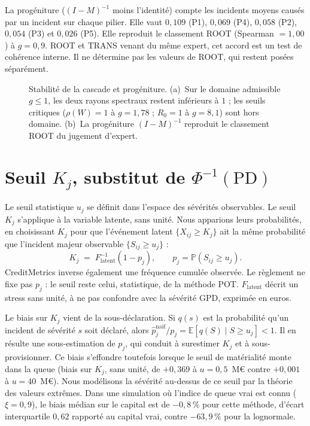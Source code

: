La progéniture ($(I-M)^{-1}$ moins l'identité) compte les incidents moyens causés par un incident sur chaque pilier.
Elle vaut $0{,}109$ (P1), $0{,}069$ (P4), $0{,}058$ (P2), $0{,}054$ (P3)
et $0{,}026$ (P5). Elle reproduit le classement ROOT (Spearman $=1{,}00$) à $g=0{,}9$.
ROOT et TRANS venant du même expert, cet accord est un test de cohérence interne.
Il ne détermine pas les valeurs de ROOT, qui restent posées séparément.

\begin{figure}[H]\centering
{}
\caption{Stabilité de la cascade et progéniture. (a)~Sur le domaine admissible $g\le1$, les deux
rayons spectraux restent inférieurs à $1$ ; les seuils critiques ($\rho(W)=1$ à $g=1{,}78$ ;
$R_0=1$ à $g=8{,}1$) sont hors domaine. (b)~La progéniture $(I-M)^{-1}$ reproduit le classement
ROOT du jugement d'expert.}
\label{fig:branchement-R0-rapport}
\end{figure}


\section{Seuil $K_j$, substitut de $\Phi^{-1}(\mathrm{PD})$}

Le seuil statistique $u_j$ se définit dans l'espace des sévérités observables. Le seuil $K_j$ s'applique à la variable latente, sans unité. Nous apparions leurs
probabilités, en choisissant $K_j$ pour que l'événement latent $\{X_{ij}\ge K_j\}$ ait la même
probabilité que l'incident majeur observable $\{S_{ij}\ge u_j\}$ :
\begin{equation}
\label{eq:Kj}
\boxed{\;K_j\;=\;F_{\mathrm{latent}}^{-1}(1-p_j), \qquad p_j=\mathbb P(S_{ij}\ge u_j).\;}
\end{equation}
CreditMetrics \citep{jpmorgan1997} inverse également une fréquence cumulée observée. Le règlement ne fixe pas $p_j$ : le seuil reste celui, statistique, de la méthode POT. $F_{\mathrm{latent}}$ décrit un stress sans unité, à ne pas confondre avec la sévérité GPD, exprimée en euros.

Le biais sur $K_j$ vient de la sous-déclaration. Si $q(s)$ est la
probabilité qu'un incident de sévérité $s$ soit déclaré, alors
$\hat p_j^{\text{naïf}}/p_j=\mathbb E[q(S)\mid S\ge u_j]<1$. Il en résulte une sous-estimation de
$p_j$, qui conduit à surestimer $K_j$ et à sous-provisionner. Ce biais s'effondre toutefois lorsque
le seuil de matérialité monte dans la queue (biais sur $K_j$, sans unité, de $+0{,}369$ à $u=0{,}5$~M\euro{} contre
$+0{,}001$ à $u=40$~M\euro{}). Nous modélisons la sévérité au-dessus de ce seuil par la théorie des valeurs
extrêmes. Dans une simulation où l'indice de queue vrai est connu ($\xi=0{,}9$), le biais médian
sur le capital est de $-0{,}8\,\%$ pour cette méthode, d'écart interquartile $0{,}62$ rapporté au capital vrai, contre
$-63{,}9\,\%$ pour la lognormale.

